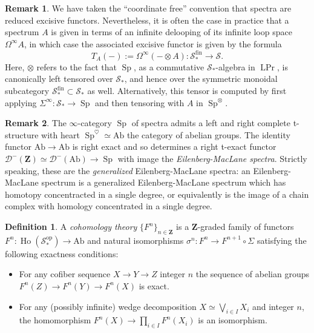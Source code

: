 \documentclass[12pt]{article}
\renewcommand{\rm}{\mdseries}
\theoremstyle{definition}
\newtheorem{definition}{Definition}[subsection]
\newtheorem{remark}{Remark}[subsection]
\newcommand{\D}{\mathcal{D}}
\renewcommand{\S}{\mathcal{S}}
\newcommand{\ZZ}{\mathbf{Z}}
\newcommand{\too}{\longrightarrow}
\newcommand{\op}{\mathrm{op}}
\DeclareMathOperator{\Ho}{Ho}
\DeclareMathOperator{\Prl}{LPr}
\DeclareMathOperator{\Sp}{Sp}
\newcommand{\Ab}{\mathrm{Ab}}
\begin{document}
\begin{remark}
We have taken the ``coordinate free'' convention that spectra are reduced excisive functors.
Nevertheless, it is often the case in practice that a spectrum $A$ is given in terms of an infinite delooping of its infinite loop space $\Omega^\infty A$, in which case the associated excisive functor is given by the formula
\[
T_A(-):=\Omega^\infty(-\otimes A)\colon\S_*^\mathrm{fin}\too\S.
\]
Here, $\otimes$ refers to the fact that $\Sp$, as a commutative $\S_*$-algebra in $\Prl$, is canonically left tensored over $\S_*$, and hence over the symmetric monoidal subcategory $\S_*^\mathrm{fin}\subset\S_*$ as well. Alternatively, this tensor is computed by first applying $\Sigma^\infty:\S_*\to\Sp$ and then tensoring with $A$ in $\Sp^\otimes$.
\end{remark}



\begin{remark}
The $\infty$-category $\Sp$ of spectra admits a left and right complete t-structure with heart
$\Sp^\heartsuit\simeq\Ab$ the category of abelian groups.
The identity functor $\Ab\to\Ab$ is right exact and so determines a right t-exact functor $\D^-(\ZZ)\simeq\D^-(\Ab)\to\Sp$ with image the {\em Eilenberg-MacLane spectra}.
Strictly speaking, these are the {\em generalized} Eilenberg-MacLane spectra: an Eilenberg-MacLane spectrum is a generalized Eilenberg-MacLane spectrum which has homotopy concentracted in a single degree, or equivalently is the image of a chain complex with homology concentrated in a single degree.
\end{remark}


\begin{definition}
A {\em cohomology theory}
$\{F^n\}_{n\in\ZZ}$ is a $\ZZ$-graded family of functors $F^n:\Ho(\S_*^{\op})\to\Ab$ and natural isomorphisms $\sigma^n:F^n\to F^{n+1}\circ \Sigma$ satisfying the following exactness conditions:
\begin{itemize}\itemsep.1em
\item[\rm{(1)}]
For any cofiber sequence $X\to Y\to Z$ integer $n$ the sequence of abelian groups $F^n(Z)\to F^n(Y)\to F^n(X)$ is exact.
\item[\rm{(2)}]
For any (possibly infinite) wedge decomposition $X\simeq\bigvee_{i\in I} X_i$ and integer $n$, the homomorphism $F^n(X)\to\prod_{i\in I} F^n(X_i)$ is an isomorphism.
\end{itemize}
\end{definition}
\end{document}
